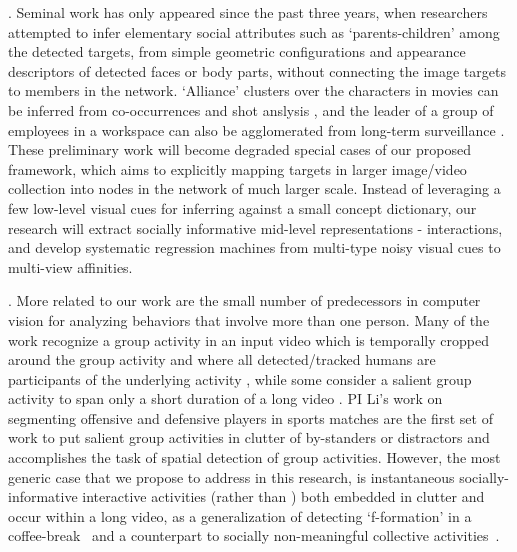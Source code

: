 
. Seminal work has only appeared since the past three years, when researchers attempted to infer elementary social attributes such as `parents-children' among the detected targets, from simple geometric configurations and appearance descriptors of detected faces or body parts\cite{Gallagher,Wang2010,Murillo2012}, without connecting the image targets to members in the network. `Alliance' clusters over the characters in movies can be inferred from co-occurrences and shot anslysis \cite{Ding2010,Ding2011}, and the leader of a group of employees in a workspace can also be agglomerated from long-term surveillance \cite{Yu2009,Zhang2011}. These preliminary work will become degraded special cases of our proposed framework, which aims to explicitly mapping targets in larger image/video collection into nodes in the network of much larger scale. Instead of leveraging a few low-level visual cues for inferring against a small concept dictionary, our research will extract socially informative mid-level representations - interactions, and develop systematic regression machines from multi-type noisy visual cues to multi-view affinities.


. More related to our work are the small number of predecessors in computer vision for analyzing behaviors that involve more than one person. Many of the work recognize a group activity in an input video which is temporally cropped around the group activity and where all detected/tracked humans are participants of the underlying activity \cite{Intille:act,Ni:group,Lan:Group}, while some consider a salient group activity to span only a short duration of a long video \cite{Hongeng:act,Gong:act,Hakeem:act,Ba:meeting,McCowan:meeting,Choi:recogtrack,Vlad:group, Ryoo:group}. PI Li's work on segmenting offensive and defensive players in sports matches \cite{LiIJCV2012,Li2010} are the first set of work to put salient group activities in clutter of by-standers or distractors and accomplishes the task of spatial detection of group activities. However, the most generic case that we propose to address in this research, is instantaneous socially-informative interactive activities (rather than ) both embedded in clutter and occur within a long video, as a generalization of detecting `f-formation' in a coffee-break~\cite{Cristani:fformation} and a counterpart to socially non-meaningful collective activities~\cite{Amer:group}.


